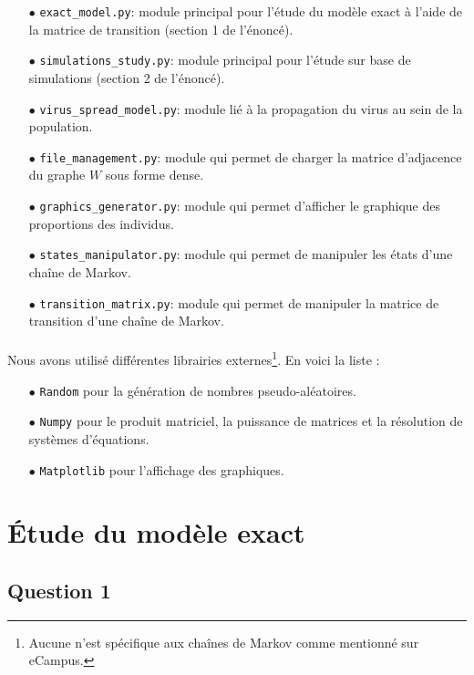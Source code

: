 \documentclass[a4paper, 12pt, oneside]{article}
\begin{document}
\begin{itemize}
	\item[$\bullet$] \texttt{exact\_model.py}: module principal pour l'étude du modèle exact à l'aide de la matrice de transition (section 1 de l'énoncé).
	\item[$\bullet$] \texttt{simulations\_study.py}: module principal pour l'étude sur base de simulations (section 2 de l'énoncé).
	\item[$\bullet$] \texttt{virus\_spread\_model.py}: module lié à la propagation du virus au sein de la population.
	\item[$\bullet$] \texttt{file\_management.py}: module qui permet de charger la matrice d'adjacence du graphe $W$ sous forme dense.
	\item[$\bullet$] \texttt{graphics\_generator.py}: module qui permet d'afficher le graphique des proportions des individus.
	\item[$\bullet$] \texttt{states\_manipulator.py}: module qui permet de manipuler les états d'une chaîne de Markov.
	\item[$\bullet$] \texttt{transition\_matrix.py}: module qui permet de manipuler la matrice de transition d'une chaîne de Markov.
\end{itemize}

\paragraph{}Nous avons utilisé différentes librairies externes\footnote{Aucune n'est spécifique aux chaînes de Markov comme mentionné sur eCampus.}. En voici la liste :

\begin{itemize}
	\item[$\bullet$] \texttt{Random} pour la génération de nombres pseudo-aléatoires.
	\item[$\bullet$] \texttt{Numpy} pour le produit matriciel, la puissance de matrices et la résolution de systèmes d'équations.
	\item[$\bullet$] \texttt{Matplotlib} pour l'affichage des graphiques.
\end{itemize}

\section{Étude du modèle exact}

\subsection{Question 1}
	
\end{document}
